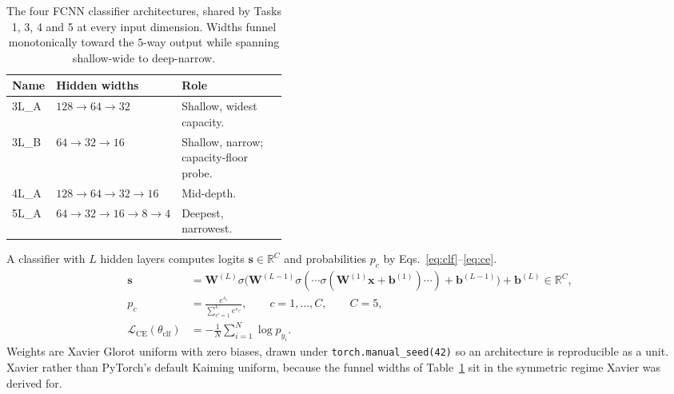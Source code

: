 \documentclass[11pt,a4paper]{article}
\newcommand{\R}{\mathbb{R}}\newcommand{\given}{\mid}\newcommand{\Acc}{\mathrm{Acc}}
\newcommand{\code}[1]{\texttt{#1}}
\begin{document}
\begin{table}[htbp]\centering
\caption{The four FCNN classifier architectures, shared by Tasks 1, 3, 4 and 5 at every input
dimension.  Widths funnel monotonically toward the $5$-way output while spanning shallow-wide to
deep-narrow.}\label{tab:archs}
\begin{tabular}{@{}llp{0.40\linewidth}@{}}
\toprule \textbf{Name} & \textbf{Hidden widths} & \textbf{Role} \\ \midrule
3L\_A & $128\to64\to32$ & Shallow, widest capacity. \\
3L\_B & $64\to32\to16$ & Shallow, narrow; capacity-floor probe. \\
4L\_A & $128\to64\to32\to16$ & Mid-depth. \\
5L\_A & $64\to32\to16\to8\to4$ & Deepest, narrowest. \\
\bottomrule
\end{tabular}
\end{table}

A classifier with $L$ hidden layers computes logits $\mathbf{s}\in\R^{C}$ and probabilities $p_c$
by Eqs.~\eqref{eq:clf}--\eqref{eq:ce}.
\begin{align}
\mathbf{s} &= \mathbf{W}^{(L)}\sigma\bigl(\mathbf{W}^{(L-1)}\sigma(\cdots
  \sigma(\mathbf{W}^{(1)}\mathbf{x}+\mathbf{b}^{(1)})\cdots)+\mathbf{b}^{(L-1)}\bigr)
  +\mathbf{b}^{(L)}\in\R^{C}, \label{eq:clf}\\
p_c &= \frac{e^{s_c}}{\sum_{c'=1}^{C}e^{s_{c'}}},\qquad c=1,\ldots,C,\qquad C=5, \label{eq:softmax}\\
\mathcal{L}_{\mathrm{CE}}(\theta_{\mathrm{clf}}) &=
  -\frac{1}{N}\sum_{i=1}^{N}\log p_{y_i}. \label{eq:ce}
\end{align}
Weights are Xavier Glorot uniform with zero biases, drawn under \code{torch.manual\_seed(42)} so
an architecture is reproducible as a unit.  Xavier rather than PyTorch's default Kaiming uniform,
because the funnel widths of Table~\ref{tab:archs} sit in the symmetric regime Xavier was derived
for.
\end{document}
